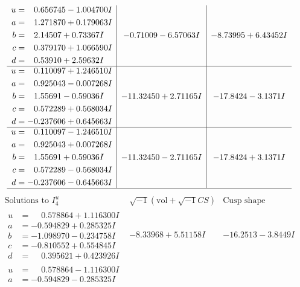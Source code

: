 \documentclass[1p]{elsarticle_modified}
\theoremstyle{definition}
\newcommand{\I}{\sqrt{-1}}
\begin{document}
$$\begin{array}{c|c|c}
\begin{aligned}
u &= \phantom{-}0.656745 - 1.004700 I \\
a &= \phantom{-}1.271870 + 0.179063 I \\
b &= \phantom{-}2.14507 + 0.73367 I \\
c &= \phantom{-}0.379170 + 1.066590 I \\
d &= \phantom{-}0.53910 + 2.59632 I\end{aligned}
 & -0.71009 - 6.57063 I & -8.73995 + 6.43452 I \\ \hline\begin{aligned}
u &= \phantom{-}0.110097 + 1.246510 I \\
a &= \phantom{-}0.925043 - 0.007268 I \\
b &= \phantom{-}1.55691 - 0.59036 I \\
c &= \phantom{-}0.572289 + 0.568034 I \\
d &= -0.237606 + 0.645663 I\end{aligned}
 & -11.32450 + 2.71165 I & -17.8424 - 3.1371 I \\ \hline\begin{aligned}
u &= \phantom{-}0.110097 - 1.246510 I \\
a &= \phantom{-}0.925043 + 0.007268 I \\
b &= \phantom{-}1.55691 + 0.59036 I \\
c &= \phantom{-}0.572289 - 0.568034 I \\
d &= -0.237606 - 0.645663 I\end{aligned}
 & -11.32450 - 2.71165 I & -17.8424 + 3.1371 I\\
 \hline 
 \end{array}$$\newpage$$\begin{array}{c|c|c}  
\text{Solutions to }I^u_{4}& \I (\text{vol} + \sqrt{-1}CS) & \text{Cusp shape}\\
 \hline 
\begin{aligned}
u &= \phantom{-}0.578864 + 1.116300 I \\
a &= -0.594829 + 0.285325 I \\
b &= -1.098970 - 0.234758 I \\
c &= -0.810552 + 0.554845 I \\
d &= \phantom{-}0.395621 + 0.423926 I\end{aligned}
 & -8.33968 + 5.51158 I & -16.2513 - 3.8449 I \\ \hline\begin{aligned}
u &= \phantom{-}0.578864 - 1.116300 I \\
a &= -0.594829 - 0.285325 I \\

\end{aligned}
\end{array}$$
\end{document}
